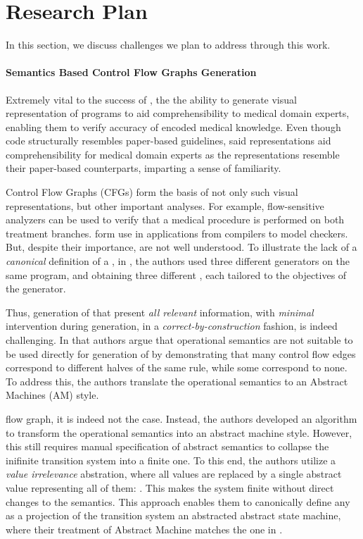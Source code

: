 \section{Research Plan}

In this section, we discuss challenges we plan to address through this work.

\paragraph{Semantics Based Control Flow Graphs Generation}

Extremely vital to the success of \MediK{}, the the ability
to generate visual representation of \MediK{} programs to aid
comprehensibility to medical domain experts, enabling them to verify
accuracy of encoded medical knowledge. Even though \MediK{} code
structurally resembles paper-based guidelines, said
representations aid comprehensibility for medical
domain experts as the representations resemble their paper-based counterparts,
imparting a sense of familiarity.

Control Flow Graphs (CFGs) form the basis of not only such visual
representations, but other important analyses. For example,
flow-sensitive analyzers can be used to verify that a medical procedure
is performed on both treatment branches.
\CGSs{} form use in applications from compilers to model checkers.
But, despite their importance, \CGSs{} are not well understood.
To illustrate the lack of a \emph{canonical} definition of a \CGS{},
in \cite{KoppelICFP22}, the authors
used three different \CFG{} generators
on the same program, and obtaining three different \CFGs{}, each
tailored to the objectives of the generator.

Thus, generation of \CFGs{} that present \emph{all relevant} information,
with \emph{minimal} intervention during generation, in a
\emph{correct-by-construction} fashion, is indeed challenging.
In \cite{KoppelICFP22} that authors argue that operational semantics
are not suitable to be used directly for generation of \CFGs{} by demonstrating
that many control flow edges correspond to different halves of the same rule,
while some correspond to none. To address this, the authors translate
the operational semantics to an Abstract Machines (AM) style.


flow graph, it is indeed not the case. Instead, the authors developed an
algorithm to transform the operational semantics into an abstract machine
style. However, this still requires manual specification of abstract
semantics to collapse the inifinite transition system into a finite one.
To this end, the
authors utilize a \emph{value irrelevance} abstration, where all values
are replaced by a single abstract value representing all of them: \startext.
This makes the system finite without direct changes to the semantics.
This approach enables them to canonically define any \CFG{} as a projection
of the transition system an abstracted abstract state machine, where their
treatment of Abstract Machine matches the one in \cite{VanhornArxiv10}.

